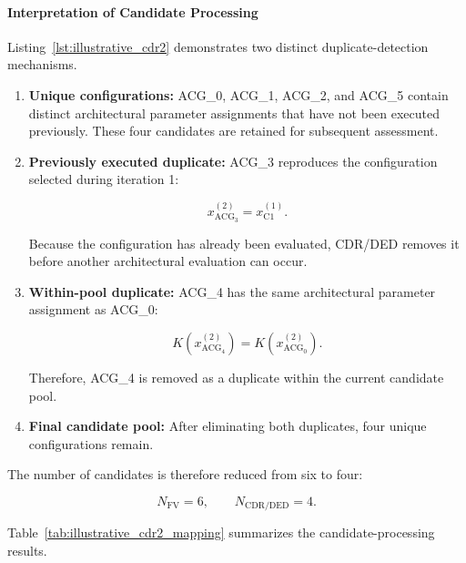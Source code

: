 \paragraph{Interpretation of Candidate Processing}

Listing~\ref{lst:illustrative_cdr2}
demonstrates two distinct duplicate-detection
mechanisms.

\begin{enumerate}

\item \textbf{Unique configurations:}
ACG\_0, ACG\_1, ACG\_2, and ACG\_5
contain distinct architectural parameter
assignments that have not been executed
previously. These four candidates are
retained for subsequent assessment.

\item \textbf{Previously executed duplicate:}
ACG\_3 reproduces the configuration
selected during iteration 1:

\begin{equation}
x_{\mathrm{ACG}_3}^{(2)}
=
x_{\mathrm{C1}}^{(1)}.
\end{equation}

Because the configuration has already
been evaluated, CDR/DED removes it
before another architectural evaluation
can occur.

\item \textbf{Within-pool duplicate:}
ACG\_4 has the same architectural
parameter assignment as ACG\_0:

\begin{equation}
K(x_{\mathrm{ACG}_4}^{(2)})
=
K(x_{\mathrm{ACG}_0}^{(2)}).
\end{equation}

Therefore, ACG\_4 is removed as a
duplicate within the current
candidate pool.

\item \textbf{Final candidate pool:}
After eliminating both duplicates,
four unique configurations remain.

\end{enumerate}

The number of candidates is therefore
reduced from six to four:

\begin{equation}
N_{\mathrm{FV}} = 6,
\qquad
N_{\mathrm{CDR/DED}} = 4.
\end{equation}

Table~\ref{tab:illustrative_cdr2_mapping}
summarizes the candidate-processing results.


